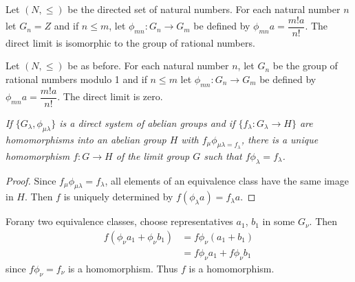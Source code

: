 \begin{example*}%
Let $(N, \le)$ be the directed set of natural numbers. For each
natural number $n$ let $G_n = Z$ and if $n \le m$, let $\phi_{mn} :
G_n \rightarrow G_m$ be defined by $\phi_{mn}  a = \dfrac{m !  a}{n
  !}$. The direct limit is isomorphic to the group of rational
numbers. 
\end{example*}

\begin{example*}%
Let $(N,\le)$ be as before. For each natural number $n$, let $G_n$ be
the group of rational numbers modulo 1 and if $n \le m$ let
$\phi_{mn} : G_n \rightarrow G_m$ be defined by $\phi_{mn}  a =
\dfrac{m !  a}{n !}$. The direct limit is zero. 
\end{example*}

\textit{If $\{ G_\lambda, \phi_{\mu\lambda} \}$ is a direct system of
  abelian groups and if $\{f_\lambda : G_\lambda \rightarrow H \}$ are
  homomorphisms into an abelian group $H$ with $f_\mu \phi_{\mu\lambda
    = f_\lambda}$, there is a unique homomorphism $f : G \rightarrow
  H$ of the limit group $G$ such that $f \phi_\lambda = f_\lambda$.} 

\begin{proof}
Since $f_{\mu} \phi_{\mu\lambda} = f_\lambda$, all elements of an
equivalence class have the same image in $H$. Then $f$ is uniquely
determined by $f(\phi_\lambda  a) = f_\lambda  a$. 
\end{proof}

For\pageoriginale any two equivalence classes, choose representatives
$a_1$, $b_1$ in some $G_\nu$. Then   
\begin{align*}
f(\phi_{\nu} a_1 + \phi_\nu b_1) & = f \phi_\nu (a_1 + b_1)\\ 
& =  f \phi_\nu a_1 + f \phi_\nu b_1 
\end{align*}
since $f \phi_\nu = f_\nu$ is a homomorphism. Thus $f$ is a
homomorphism. 
